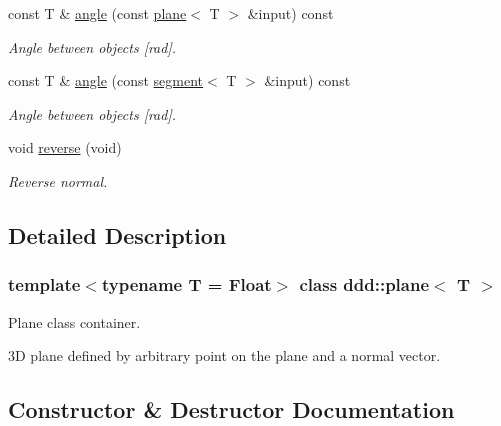 \begin{DoxyCompactItemize}
const T \& \hyperlink{classddd_1_1plane_ae6f58f5c23ff49aa351f22ccccee46b6}{angle} (const \hyperlink{classddd_1_1plane}{plane}$<$ T $>$ \&input) const
\begin{DoxyCompactList}\small\item\em Angle between objects \mbox{[}rad\mbox{]}. \end{DoxyCompactList}\item 
const T \& \hyperlink{classddd_1_1plane_a6a9a1c5fb177702ee67e330d803762ab}{angle} (const \hyperlink{classddd_1_1segment}{segment}$<$ T $>$ \&input) const
\begin{DoxyCompactList}\small\item\em Angle between objects \mbox{[}rad\mbox{]}. \end{DoxyCompactList}\item 
\mbox{\label{classddd_1_1plane_a7a09a14f3a71897ad20b0d377b0f643d}} 
void \hyperlink{classddd_1_1plane_a7a09a14f3a71897ad20b0d377b0f643d}{reverse} (void)
\begin{DoxyCompactList}\small\item\em Reverse normal. \end{DoxyCompactList}\end{DoxyCompactItemize}


\subsection{Detailed Description}
\subsubsection*{template$<$typename T = Float$>$\newline
class ddd\+::plane$<$ T $>$}

Plane class container. 

3D plane defined by arbitrary point on the plane and a normal vector. 

\subsection{Constructor \& Destructor Documentation}
\mbox{\label{classddd_1_1plane_a8b461d0d53aaf84c68875c376e804de3}} 
